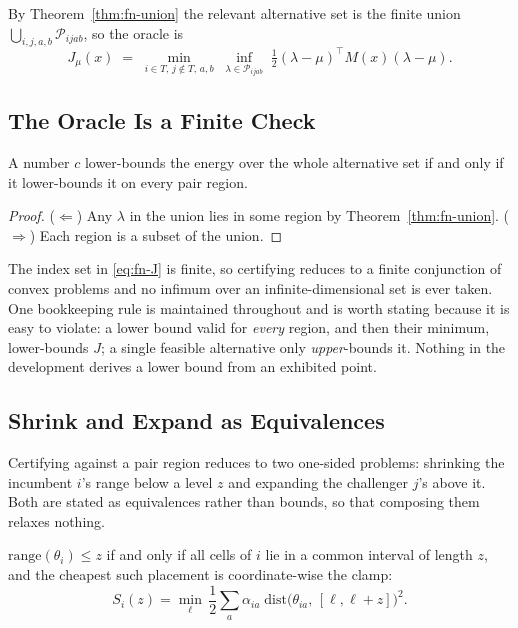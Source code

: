 By Theorem~\ref{thm:fn-union} the relevant alternative set is the finite union
$\bigcup_{i,j,a,b}\mathcal{P}_{ijab}$, so the oracle is
\begin{equation}
J_\mu(x)\;=\;\min_{i\in T,\,j\notin T,\,a,b}\;
\inf_{\lambda\in\mathcal{P}_{ijab}}\;
\tfrac{1}{2}(\lambda-\mu)^{\top}M(x)(\lambda-\mu).
\label{eq:fn-J}
\end{equation}

\subsection{The Oracle Is a Finite Check}
\label{sec:fn-oracle}

\begin{theorem}
\label{thm:fn-oracle}
A number $c$ lower-bounds the energy over the whole alternative set if and only if it
lower-bounds it on every pair region.
\end{theorem}

\begin{proof}
($\Leftarrow$) Any $\lambda$ in the union lies in some region by Theorem~\ref{thm:fn-union}.
($\Rightarrow$) Each region is a subset of the union.
\end{proof}


The index set in \eqref{eq:fn-J} is finite, so certifying reduces to a finite conjunction of
convex problems and no infimum over an infinite-dimensional set is ever taken. One
bookkeeping rule is maintained throughout and is worth stating because it is easy to violate:
a lower bound valid for \emph{every} region, and then their minimum, lower-bounds $J$; a
single feasible alternative only \emph{upper}-bounds it. Nothing in the development derives a
lower bound from an exhibited point.

\subsection{Shrink and Expand as Equivalences}
\label{sec:fn-shrink}

Certifying against a pair region reduces to two one-sided problems: shrinking the incumbent
$i$'s range below a level $z$ and expanding the challenger $j$'s above it. Both are stated as
equivalences rather than bounds, so that composing them relaxes nothing.

\begin{theorem}[Shrink]
\label{thm:fn-shrink}
$\mathrm{range}(\theta_{i})\le z$ if and only if all cells of $i$ lie in a common interval of
length $z$, and the cheapest such placement is coordinate-wise the clamp:
\begin{equation}
S_{i}(z)=\min_{\ell}\,\frac{1}{2}\sum_{a}\alpha_{ia}\;
\mathrm{dist}\bigl(\theta_{ia},\,[\ell,\ell+z]\bigr)^{2}.
\label{eq:fn-shrink}
\end{equation}
\end{theorem}


